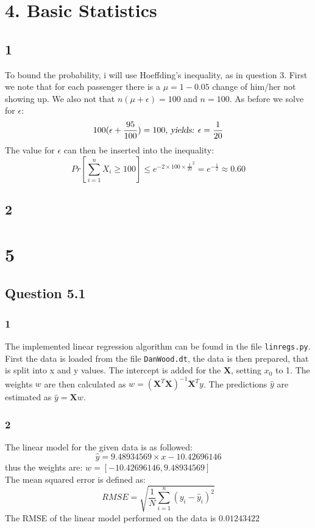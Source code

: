 \documentclass{article}
\begin{document}
\section{4. Basic Statistics}
\subsection{1}
To bound the probability, i will use Hoeffding's inequality, as in question 3. First we note that for each passenger there is a $\mu = 1-0.05$ change of him/her not showing up. We also not that $n(\mu + \epsilon) = 100$ and $n=100$. As before we solve for $\epsilon$:
$$ 
100(\epsilon + \frac{95}{100}) = 100 \textsl{, yields: } \epsilon = \dfrac{1}{20}
$$
The value for $\epsilon$ can then be inserted into the inequality:
\begin{equation*}
Pr \left[ \sum\limits^{n}_{i=1}X_i \geq 100 \right] \leq e^{-2 \times 100 \times \frac{1}{20}^2} = e^{-\frac{1}{2}}  \approx 0.60
\end{equation*}
\subsection{2}
\section{5}
\subsection{Question 5.1}
\subsubsection{1}
The implemented linear regression algorithm can be found in the file \texttt{linregs.py}. \\
First the data is loaded from the file \texttt{DanWood.dt}, the data is then prepared, that is split into x and y values. The intercept is added for the $\mathbf{X}$, setting $x_0$ to 1. The weights $w$ are then calculated as  $w = (\mathbf{X}^T \mathbf{X})^{-1}\mathbf{X}^T y$. The predictions $\hat{y}$ are estimated as $ \hat{y} = \mathbf{X}w$.
\subsubsection{2}
The linear model for the given data is as followed: 
$$ \hat{y} = 9.48934569 \times x - 10.42696146 $$
thus the weights are: $w=[-10.42696146,9.48934569]$ \\ The mean squared error is defined as:
\begin{equation*}
RMSE = \sqrt{ \dfrac{1}{N} \sum\limits^{n}_{i=1} (y_i - \hat{y}_i )^2}
\end{equation*}
The RMSE of the linear model performed on the data is $0.01243422$
\end{document}
